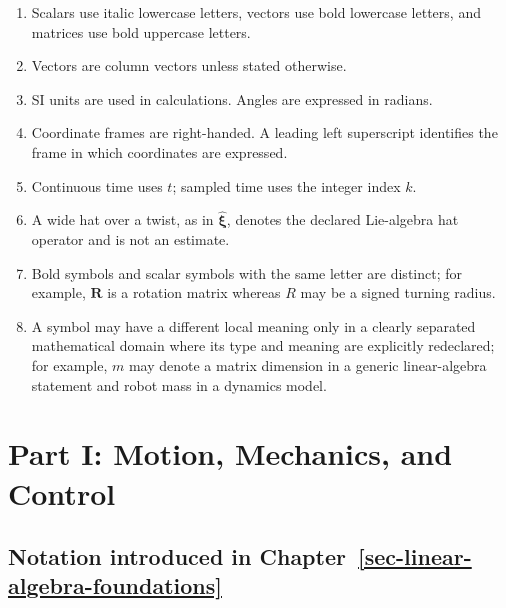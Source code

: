 \documentclass[
  australian,
  12pt,
  letterpaper,
  DIV=11,
  numbers=noendperiod,
  twoside]{scrreprt}
\providecommand{\tightlist}{%
  \setlength{\itemsep}{0pt}\setlength{\parskip}{0pt}}
\begin{document}

\begin{enumerate}
\def\labelenumi{\arabic{enumi}.}
\tightlist
\item
  Scalars use italic lowercase letters, vectors use bold lowercase
  letters, and matrices use bold uppercase letters.
\item
  Vectors are column vectors unless stated otherwise.
\item
  SI units are used in calculations. Angles are expressed in radians.
\item
  Coordinate frames are right-handed. A leading left superscript
  identifies the frame in which coordinates are expressed.
\item
  Continuous time uses \(t\); sampled time uses the integer index \(k\).
\item
  A wide hat over a twist, as in \(\widehat{\boldsymbol\xi}\), denotes
  the declared Lie-algebra hat operator and is not an estimate.
\item
  Bold symbols and scalar symbols with the same letter are distinct; for
  example, \(\mathbf R\) is a rotation matrix whereas \(R\) may be a
  signed turning radius.
\item
  A symbol may have a different local meaning only in a clearly
  separated mathematical domain where its type and meaning are
  explicitly redeclared; for example, \(m\) may denote a matrix
  dimension in a generic linear-algebra statement and robot mass in a
  dynamics model.
\end{enumerate}

\section*{Part I: Motion, Mechanics, and
Control}\label{part-i-motion-mechanics-and-control}


\subsection*{\texorpdfstring{Notation introduced in
Chapter~\ref{sec-linear-algebra-foundations}}{Notation introduced in Chapter~}}\label{notation-introduced-in-sec-linear-algebra-foundations}
\end{document}
